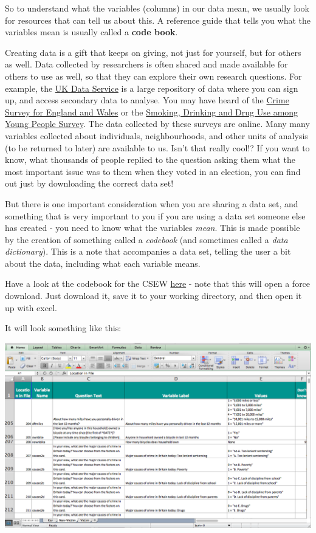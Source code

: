 \documentclass[]{book}
\theoremstyle{definition}
\theoremstyle{definition}
\theoremstyle{definition}
\theoremstyle{remark}
\begin{document}
So to understand what the variables (columns) in our data mean, we
usually look for resources that can tell us about this. A reference
guide that tells you what the variables mean is usually called a
\textbf{code book}.

Creating data is a gift that keeps on giving, not just for yourself, but
for others as well. Data collected by researchers is often shared and
made available for others to use as well, so that they can explore their
own research questions. For example, the
\href{https://www.ukdataservice.ac.uk/}{UK Data Service} is a large
repository of data where you can sign up, and access secondary data to
analyse. You may have heard of the
\href{http://www.crimesurvey.co.uk/}{Crime Survey for England and Wales}
or the \href{http://content.digital.nhs.uk/catalogue/PUB17879}{Smoking,
Drinking and Drug Use among Young People Survey}. The data collected by
these surveys are online. Many many variables collected about
individuals, neighbourhoods, and other units of analysis (to be returned
to later) are available to us. Isn't that really cool!? If you want to
know, what thousands of people replied to the question asking them what
the most important issue was to them when they voted in an election, you
can find out just by downloading the correct data set!

But there is one important consideration when you are sharing a data
set, and something that is very important to you if you are using a data
set someone else has created - you need to know what the variables
\emph{mean}. This is made possible by the creation of something called a
\emph{codebook} (and sometimes called a \emph{data dictionary}). This is
a note that accompanies a data set, telling the user a bit about the
data, including what each variable means.

Have a look at the codebook for the CSEW
\href{http://doc.ukdataservice.ac.uk/doc/7889/mrdoc/excel/7889_csew_data_dictionary_2002-03_to_2014-15.xlsx}{here}
- note that this will open a force download. Just download it, save it
to your working directory, and then open it up with excel.

It will look something like this:

\includegraphics{imgs/csew_dictionary.png}
\end{document}
